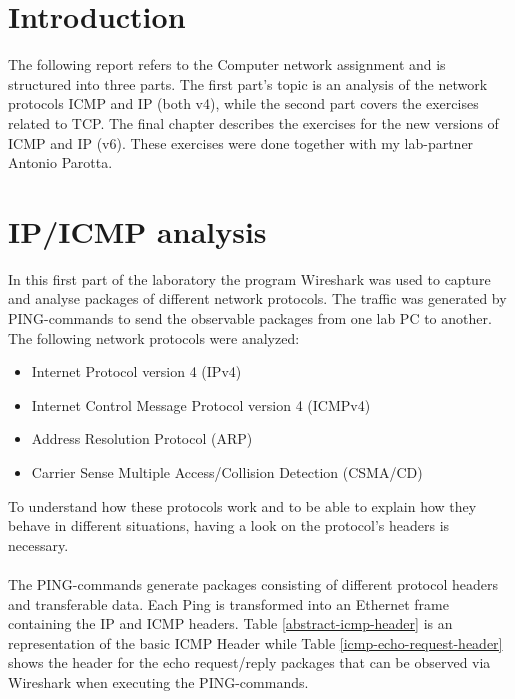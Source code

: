 \lstset{language=Java, numbers=left, numberstyle=\tiny, stepnumber=2, numbersep=5pt}
\chapter{Introduction}
\label{intro}
The following report refers to the Computer network assignment and is structured into three parts. The first part's topic is an analysis of the network protocols ICMP and IP (both v4), while the second part covers the exercises related to TCP. The final chapter describes the exercises for the new versions of ICMP and IP (v6). These exercises were done together with my lab-partner Antonio Parotta.

\chapter{IP/ICMP analysis}
\label{ipv4}

In this first part of the laboratory the program Wireshark was used to capture and analyse packages of different network protocols. The traffic was generated by PING-commands to send the observable packages from one lab PC to another. The following network protocols were analyzed:
\begin{itemize}
	\item Internet Protocol version 4 (IPv4)
	\item Internet Control Message Protocol version 4 (ICMPv4)
	\item Address Resolution Protocol (ARP)
	\item Carrier Sense Multiple Access/Collision Detection (CSMA/CD)
\end{itemize}
To understand how these protocols work and to be able to explain how they behave in different situations, having a look on the protocol's headers is necessary. \\\\
The PING-commands generate packages consisting of different protocol headers and transferable data. Each Ping is transformed into an Ethernet frame containing the IP and ICMP headers. Table \ref{abstract-icmp-header} is an representation of the basic ICMP Header while Table \ref{icmp-echo-request-header} shows the header for the echo request/reply packages that can be observed via Wireshark when executing the PING-commands.

